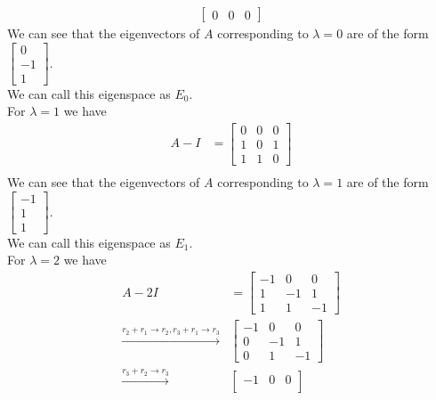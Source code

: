 \documentclass[answers,12pt,addpoints]{exam}
\begin{document}
\begin{questions}
\begin{solution}
\begin{align*}
\begin{bmatrix}
                0 & 0 & 0
            \end{bmatrix}
        \end{align*}
        We can see that the eigenvectors of $A$ corresponding to $\lambda = 0$ are of the form $\begin{bmatrix}
            0\\
            -1\\
            1
        \end{bmatrix}$.\\
        We can call this eigenspace as $E_{0}$.\\
        For $\lambda = 1$ we have
        \begin{align*}
            A - I &= \begin{bmatrix}
                0 & 0 & 0\\
                1 & 0 & 1\\
                1 & 1 & 0
            \end{bmatrix} \\
        \end{align*}
        We can see that the eigenvectors of $A$ corresponding to $\lambda = 1$ are of the form $\begin{bmatrix}
            -1\\
            1\\
            1
        \end{bmatrix}$.\\
        We can call this eigenspace as $E_{1}$.\\
        For $\lambda = 2$ we have
        \begin{align*}
            A - 2I &= \begin{bmatrix}
                -1 & 0 & 0\\
                1 & -1 & 1\\
                1 & 1 & -1
            \end{bmatrix} \\
            \xrightarrow{r_2 + r_1 \to r_2, r_3 + r_1 \to r_3} &\begin{bmatrix}
                -1 & 0 & 0\\
                0 & -1 & 1\\
                0 & 1 & -1
            \end{bmatrix} \\
            \xrightarrow{r_3 + r_2 \to r_3} &\begin{bmatrix}
                -1 & 0 & 0\\

\end{bmatrix}
\end{align*}
\end{solution}
\end{questions}
\end{document}
